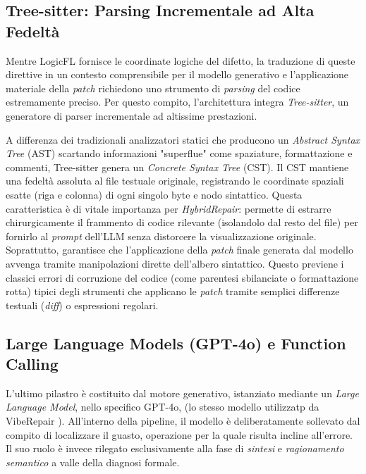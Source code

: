 \subsection{Tree-sitter: Parsing Incrementale ad Alta Fedeltà}
Mentre LogicFL fornisce le coordinate logiche del difetto, la traduzione di queste direttive in un contesto 
comprensibile per il modello generativo e l'applicazione materiale della \textit{patch} richiedono uno strumento 
di \textit{parsing} del codice estremamente preciso. Per questo compito, l'architettura integra \textit{Tree-sitter}, 
un generatore di parser incrementale ad altissime prestazioni.

A differenza dei tradizionali analizzatori statici che producono un \textit{Abstract Syntax Tree} (AST) scartando 
informazioni "superflue" come spaziature, formattazione e commenti, Tree-sitter genera un \textit{Concrete Syntax Tree} (CST). 
Il CST mantiene una fedeltà assoluta al file testuale originale, registrando le coordinate spaziali esatte 
(riga e colonna) di ogni singolo byte e nodo sintattico. 
Questa caratteristica è di vitale importanza per \textit{HybridRepair}: permette di estrarre chirurgicamente il 
frammento di codice rilevante (isolandolo dal resto del file) per fornirlo al \textit{prompt} dell'LLM senza 
distorcere la visualizzazione originale. Soprattutto, garantisce che l'applicazione della \textit{patch} finale 
generata dal modello avvenga tramite manipolazioni dirette dell'albero sintattico. Questo previene i classici errori 
di corruzione del codice (come parentesi sbilanciate o formattazione rotta) tipici degli strumenti che applicano le 
\textit{patch} tramite semplici differenze testuali (\textit{diff}) o espressioni regolari.

\subsection{Large Language Models (GPT-4o) e Function Calling}
L'ultimo pilastro è costituito dal motore generativo, istanziato mediante un \textit{Large Language Model}, 
nello specifico GPT-4o, (lo stesso modello utilizzatp da VibeRepair \cite{zhu2026specification}). All'interno della pipeline, il modello è deliberatamente sollevato dal compito di localizzare il guasto, 
operazione per la quale risulta incline all'errore. Il suo ruolo è invece rilegato 
esclusivamente alla fase di \textit{sintesi} e \textit{ragionamento semantico} a valle della diagnosi formale.

